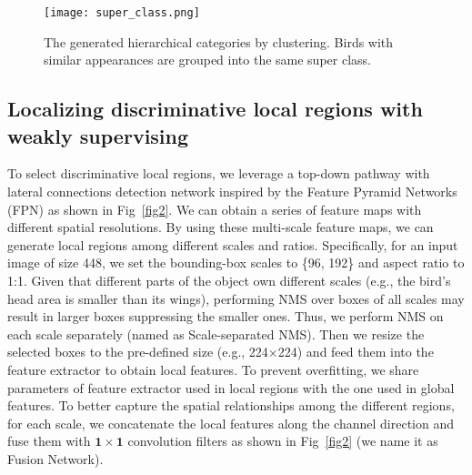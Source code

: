 \documentclass[10pt,twocolumn,letterpaper]{article}
\begin{document}
\begin{figure}[t]
\begin{center}
\texttt{[image: super\_class.png]}
\end{center}
   \caption{The generated hierarchical categories by clustering. Birds with similar appearances are grouped into the same super class. }
\label{superclass}
\end{figure}
\subsection{Localizing discriminative local regions with weakly supervising}
To select discriminative local regions, we leverage a top-down pathway with lateral connections detection network inspired by the Feature Pyramid Networks (FPN)\cite{lin2017feature} as shown in Fig~\ref{fig2}. We can obtain a series of feature maps with different spatial resolutions. By using these multi-scale feature maps, we can generate local regions among different scales and ratios. Specifically, for an input image of size 448, we set the bounding-box scales to \{96, 192\} and aspect ratio to 1:1. Given that different parts of the object own different scales (e.g., the bird's head area is smaller than its wings), performing NMS over boxes of all scales may result in larger boxes suppressing the smaller ones.
Thus, we perform NMS on each scale separately (named as Scale-separated NMS). Then we resize the selected boxes to the pre-defined size (e.g., 224$\times$224) and feed them into the feature extractor to obtain local features. To prevent overfitting, we share parameters of feature extractor used in local regions with the one used in global features. To better capture the spatial relationships among the different regions, for each scale, we concatenate the local features along the channel direction and fuse them with $\bm{1\times1}$ convolution filters as shown in Fig~\ref{fig2} (we name it as Fusion Network).
\end{document}

